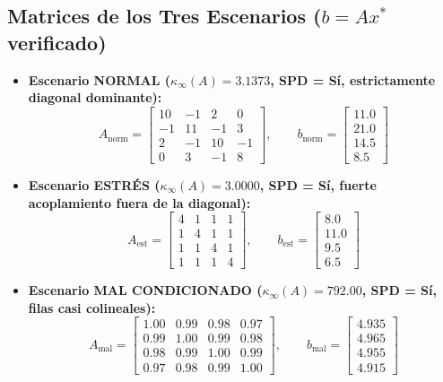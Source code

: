 \documentclass[a4paper,12pt]{article}
\begin{document}
\subsection{Matrices de los Tres Escenarios ($b = A x^*$ verificado)}
\begin{itemize}
    \item \textbf{Escenario NORMAL ($\kappa_\infty(A) = 3.1373$, SPD = Sí, estrictamente diagonal dominante):}
    \begin{equation}
        A_{\text{norm}} = \begin{bmatrix} 10 & -1 & 2 & 0 \\ -1 & 11 & -1 & 3 \\ 2 & -1 & 10 & -1 \\ 0 & 3 & -1 & 8 \end{bmatrix}, \qquad b_{\text{norm}} = \begin{bmatrix} 11.0 \\ 21.0 \\ 14.5 \\ 8.5 \end{bmatrix}
    \end{equation}
    \item \textbf{Escenario ESTRÉS ($\kappa_\infty(A) = 3.0000$, SPD = Sí, fuerte acoplamiento fuera de la diagonal):}
    \begin{equation}
        A_{\text{est}} = \begin{bmatrix} 4 & 1 & 1 & 1 \\ 1 & 4 & 1 & 1 \\ 1 & 1 & 4 & 1 \\ 1 & 1 & 1 & 4 \end{bmatrix}, \qquad b_{\text{est}} = \begin{bmatrix} 8.0 \\ 11.0 \\ 9.5 \\ 6.5 \end{bmatrix}
    \end{equation}
    \item \textbf{Escenario MAL CONDICIONADO ($\kappa_\infty(A) = 792.00$, SPD = Sí, filas casi colineales):}
    \begin{equation}
        A_{\text{mal}} = \begin{bmatrix} 1.00 & 0.99 & 0.98 & 0.97 \\ 0.99 & 1.00 & 0.99 & 0.98 \\ 0.98 & 0.99 & 1.00 & 0.99 \\ 0.97 & 0.98 & 0.99 & 1.00 \end{bmatrix}, \qquad b_{\text{mal}} = \begin{bmatrix} 4.935 \\ 4.965 \\ 4.955 \\ 4.915 \end{bmatrix}
    \end{equation}
\end{itemize}
\end{document}
